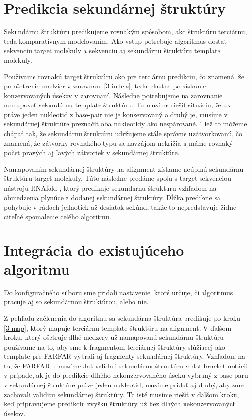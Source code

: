 \section{Predikcia sekundárnej štruktúry}
Sekundárnu štruktúru predikujeme rovnakým spôsobom, ako štruktúru terciárnu, teda komparatívnym modelovaním. Ako vstup potrebuje algoritmus dostať sekvenciu target molekuly a sekvenciu aj sekundárnu štruktúru template molekuly. 


\indent  Používame rovnakú target štruktúru ako pre terciárnu predikciu, čo znamená, že po ošetrenie medzier v zarovnaní \ref{3-indels}, teda vlastne po získanie konzervovaných úsekov v zarovnaní. Následne potrebujeme na zarovnanie namapovať sekundárnu template štruktúru. Tu musíme riešiť situáciu, že ak práve jeden nukleotid z base-pair nie je konzervovaný a druhý je, musíme v sekundárnej štruktúre preznačiť oba nukleotidy ako nespárované. Tiež to môžeme chápať tak, že sekundárnu štruktúru udržujeme stále správne uzátvorkovanú, čo znamená, že zátvorky rovnakého typu sa navzájom nekrížia a máme rovnaký počet pravých aj ľavých zátvoriek v sekundárnej štruktúre.


\indent Namapovaním sekundárnej štruktúry na alignment získame neúplnú sekundárnu štruktúru target molekuly. Túto následne predáme spolu s target sekvenciou nástroju RNAfold \cite{RNAfold}, ktorý predikuje sekundárnu štruktúru vzhľadom na obmedzenia plynúce z dodanej sekundárnej štruktúry. Dĺžka predikcie sa pohybuje v rádoch jednotiek až desiatok sekúnd, takže to nepredstavuje židne citeľné spomalenie celého algoritmu. 


\section{Integrácia do existujúceho algoritmu}
Do konfiguračného súboru sme pridali nastavenie, ktoré určuje, či algoritmus pracuje aj so sekundárnou štruktúrou, alebo nie.


\indent Z pohľadu začlenenia do algoritmu sa sekundárna štruktúra predikuje po kroku \ref{3-map}, ktorý mapuje terciárnu template štruktúru na alignment. V ďalšom kroku, ktorý ošetruje dlhé medzery už namapovanú sekundárnu štruktúru používame na to, aby sme k fragmentom terciárnej štruktúry slúžiacej ako template pre FARFAR vybrali aj fragmenty sekundárnej štruktúry. Vzhľadom na to, že FARFAR-u musíme dať validnú sekundárnu štruktúru v dot-bracket notácii v prípade, ak je do predikcie dlhého nekonzervovaného úseku vybraný z base-paru v sekundárnej štruktúre práve jeden nukleotid, musíme pridať aj druhý, aby sme zachovali validitu sekundárnej štruktúry. To isté musíme riešiť v ďalšom kroku, keď pripravujeme predikciu zvyšku štruktúry už bez dlhých nekonzervovaných úsekov. 


